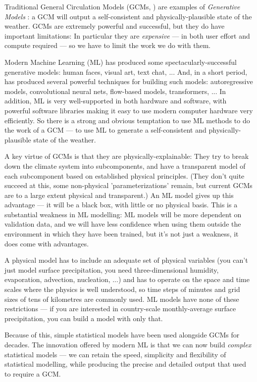 \documentclass[gmd]{copernicus}
\begin{document}
Traditional General Circulation Models (GCMs, \citet{phillips1956general}) are examples of {\em Generative Models} \citep{Generative}: a GCM will output a self-consistent and physically-plausible state of the weather. GCMs are extremely powerful and successful, but they do have important limitations: In particular they are {\em expensive} --- in both user effort and compute required --- so we have to limit the work we do with them.

Modern Machine Learning (ML) has produced some spectacularly-successful generative models: human faces, visual art, text chat, ... And, in a short period, has produced several powerful techniques for building such models: autoregressive models, convolutional neural nets, flow-based models, transformers, ... In addition, ML is very well-supported in both hardware and software, with powerful software libraries making it easy to use modern computer hardware very efficiently. So there is a strong and obvious temptation to use ML methods to do the work of a GCM --- to use ML to generate a self-consistent and physically-plausible state of the weather.

A key virtue of GCMs is that they are physically-explainable: They try to break down the climate system into subcomponents, and have a transparent model of each subcomponent based on established physical principles. (They don't quite succeed at this, some non-physical 'parameterizations' remain, but current GCMs are to a large extent physical and transparent.) An ML model gives up this advantage --- it will be a black box, with little or no physical basis. This is a substantial weakness in ML modelling: ML models will be more dependent on validation data, and we will have less confidence when using them outside the environment in which they have been trained, but it's not just a weakness, it does come with advantages.

A physical model has to include an adequate set of physical variables (you can't just model surface precipitation, you need three-dimensional humidity, evaporation, advection, nucleation, ...) and has to operate on the space and time scales where the physics is well understood, so time steps of minutes and grid sizes of tens of kilometres are commonly used. ML models have none of these restrictions --- if you are interested in country-scale monthly-average surface precipitation, you can build a model with only that.

Because of this, simple statistical models have been used alongside GCMs for decades. The innovation offered by modern ML is that we can now build {\it complex} statistical models --- we can retain the speed, simplicity and flexibility of statistical modelling, while producing the precise and detailed output that used to require a GCM.
\end{document}
